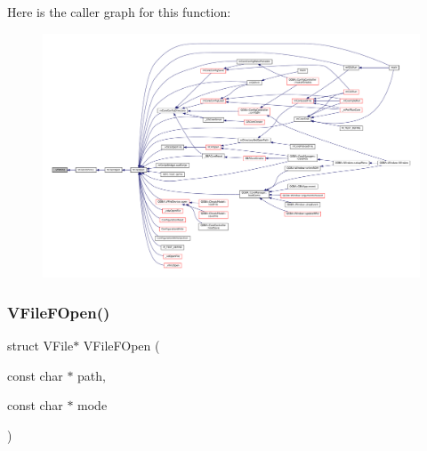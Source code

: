 Here is the caller graph for this function\+:
\nopagebreak
\begin{figure}[H]
\begin{center}
\leavevmode
\includegraphics[width=350pt]{vfs-file_8c_addc171631afec453d709b1a6f2fff3cb_icgraph}
\end{center}
\end{figure}
\mbox{\label{vfs-file_8c_a88c63b95e9d220a5584a0ce98a54c6c8}} 
\subsubsection{\texorpdfstring{V\+File\+F\+Open()}{VFileFOpen()}}
{\footnotesize\ttfamily struct V\+File$\ast$ V\+File\+F\+Open (\begin{DoxyParamCaption}\item[{const char $\ast$}]{path,  }\item[{const char $\ast$}]{mode }\end{DoxyParamCaption})}

